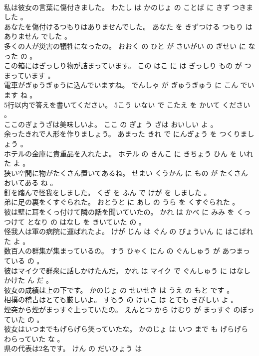 \documentclass[8pt]{extreport}
\begin{document}
\begin{CJK}{UTF8}{min}
\\	私は彼女の言葉に傷付きました。	わたし は かのじょ の ことば に きず つきました 。 
\\	あなたを傷付けるつもりはありませんでした。	あなた を きずつける つもり は ありません でした 。 
\\	多くの人が災害の犠牲になったの。	おおく の ひと が さいがい の ぎせい に なった の 。 
\\	この箱にはぎっしり物が詰まっています。	この はこ に は ぎっしり もの が つまっています 。 
\\	電車がぎゅうぎゅうに込んでいますね。	でんしゃ が ぎゅうぎゅう に こん でいます ね 。 
\\	5行以内で答えを書いてください。	5こう いない で こたえ を かいて ください 。 
\\	ここのぎょうざは美味しいよ。	ここ の ぎょ う ざは おいしい よ 。 
\\	余ったきれで人形を作りましょう。	あまった きれ で にんぎょう を つくりましょう 。 
\\	ホテルの金庫に貴重品を入れたよ。	ホテル の きんこ に きちょう ひん を いれた よ 。 
\\	狭い空間に物がたくさん置いてあるね。	せまい くうかん に もの が たくさん おいてある ね 。 
\\	釘を踏んで怪我をしました。	くぎ を ふん で けが を しました 。 
\\	弟に足の裏をくすぐられた。	おとうと に あし の うら を くすぐられた 。 
\\	彼は壁に耳をくっ付けて隣の話を聞いていたの。	かれ は かべ に みみ を くっ つけて となり の はなし を きいていた の 。 
\\	怪我人は軍の病院に運ばれたよ。	けが じん は ぐん の びょういん に はこばれた よ 。 
\\	数百人の群集が集まっているの。	すう ひゃく にん の ぐんしゅう が あつまっている の 。 
\\	彼はマイクで群衆に話しかけたんだ。	かれ は マイク で ぐんしゅう に はなしかけた ん だ 。 
\\	彼女の成績は上の下です。	かのじょ の せいせき は うえ の もと です 。 
\\	相撲の稽古はとても厳しいよ。	すもう の けいこ は とても きびしい よ 。 
\\	煙突から煙がまっすぐ上っていたの。	えんとつ から けむり が まっすぐ のぼっていた の 。 
\\	彼女はいつまでもげらげら笑っていたな。	かのじょ は いつ まで も げらげら わらっていた な 。 
\\	県の代表は2名です。	けん の だいひょう は 

\end{CJK}
\end{document}
